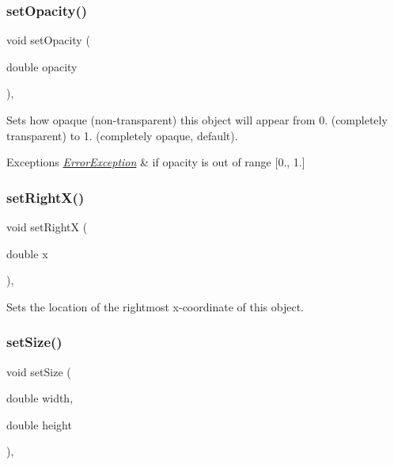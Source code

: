 \subsubsection{\texorpdfstring{set\+Opacity()}{setOpacity()}}
{\footnotesize\ttfamily void set\+Opacity (\begin{DoxyParamCaption}\item[{double}]{opacity }\end{DoxyParamCaption})\hspace{0.3cm}{\ttfamily [virtual]}, {\ttfamily [inherited]}}



Sets how opaque (non-\/transparent) this object will appear from 0. (completely transparent) to 1. (completely opaque, default). 


\begin{DoxyExceptions}{Exceptions}
{\em \mbox{\hyperlink{classErrorException}{Error\+Exception}}} & if opacity is out of range \mbox{[}0., 1.\mbox{]} \\
\hline
\end{DoxyExceptions}
\mbox{\label{classGObject_a3c90b758cdc2c911c9ef76c4360eb912}} 
\subsubsection{\texorpdfstring{set\+Right\+X()}{setRightX()}}
{\footnotesize\ttfamily void set\+RightX (\begin{DoxyParamCaption}\item[{double}]{x }\end{DoxyParamCaption})\hspace{0.3cm}{\ttfamily [virtual]}, {\ttfamily [inherited]}}



Sets the location of the rightmost x-\/coordinate of this object. 

\mbox{\label{classGObject_aca25d49481f9bf5fc8f7df4c086c4ce7}} 
\subsubsection{\texorpdfstring{set\+Size()}{setSize()}\hspace{0.1cm}{\footnotesize\ttfamily [1/2]}}
{\footnotesize\ttfamily void set\+Size (\begin{DoxyParamCaption}\item[{double}]{width,  }\item[{double}]{height }\end{DoxyParamCaption})\hspace{0.3cm}{\ttfamily [virtual]}, {\ttfamily [inherited]}}



